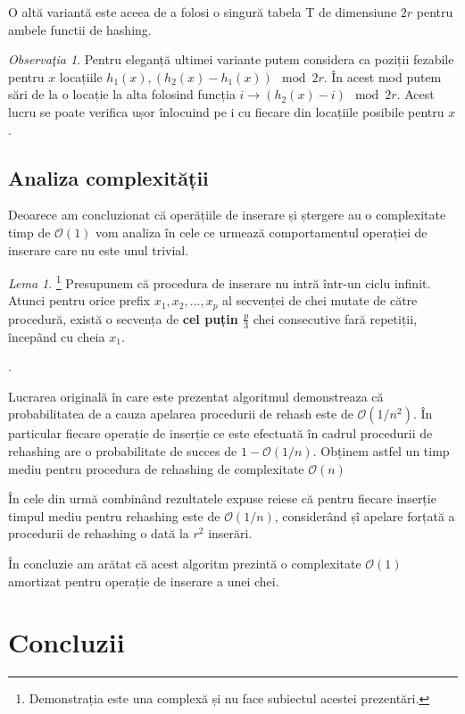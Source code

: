 \documentclass[a4paper]{article}
\theoremstyle{remark}
\newtheorem{remark}{Observa\c{t}ia}
\newtheorem{lemma}[theorem]{Lema}
\theoremstyle{definition}
\begin{document}
O altă variantă este aceea de a folosi o singură tabela T de dimensiune $2r$ pentru ambele functii de hashing.

\begin{remark}
Pentru eleganță ultimei variante putem considera ca poziții fezabile pentru $x$ locațiile $h_1(x), (h_2(x) - h_1(x)) \mod 2r$. În acest mod putem sări de la o locație la alta folosind funcția $i \to (h_2(x) - i) \mod 2r$. Acest lucru se poate verifica ușor înlocuind pe i cu fiecare din locațiile posibile pentru $x$.
\end{remark}

\subsection{Analiza complexității}

Deoarece am concluzionat că operățiile de inserare și ștergere au o complexitate timp de $\mathcal{O}(1)$ vom analiza în cele ce urmează comportamentul operației de inserare care nu este unul trivial.

\begin{lemma}
\footnote{Demonstrația este una complexă și nu face subiectul acestei prezentări.}
Presupunem că procedura de inserare nu intră într-un ciclu infinit. Atunci pentru orice prefix $x_1, x_2, ..., x_p$ al secvenței de chei mutate de către procedură, există o secvența de \textbf{cel puțin $\frac{p}{3}$} chei consecutive fară repetiții, începând cu cheia $x_1$.
\end{lemma}.

Lucrarea originală în care este prezentat algoritmul demonstreaza că probabilitatea de a cauza apelarea procedurii de rehash este de $\mathcal{O}(1/n^2)$. În particular fiecare operație de inserție ce este efectuată în cadrul procedurii de rehashing are o probabilitate de succes de $1 - \mathcal{O}(1/n)$. Obținem astfel un timp mediu pentru procedura de rehashing de complexitate $\mathcal{O}(n)$ 

În cele din urmă combinând rezultatele expuse reiese că pentru fiecare inserție timpul mediu pentru rehashing este de $\mathcal{O}(1/n)$, considerând șî apelare forțată a procedurii de rehashing o dată la $r^2$ inserări.

În concluzie am arătat că acest algoritm prezintă o complexitate $\mathcal{O}(1)$ amortizat pentru operație de inserare a unei chei.

\section {Concluzii}
\end{document}
